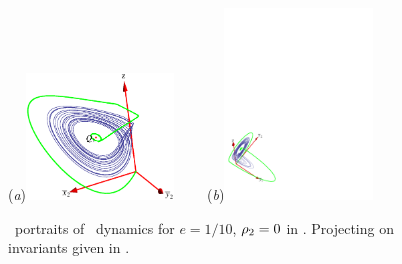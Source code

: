 \begin{figure}[ht]
\begin{center}
  (\textit{a})\includegraphics[width=0.35\textwidth]{../figs/CLEmfXYZ}
~~~~(\textit{b})\includegraphics[width=0.35\textwidth]{../figs/CLEmfYYZ}
\end{center}
\caption[Orbit space projection of Complex Lorenz flow: Moving frame]{ \Statesp\
portraits of \CLe\ dynamics for $e=1/10$, $\rho_2=0$
in \reducedsp. Projecting on invariants given in .
    }
\label{fig:CLEmf}
\end{figure}

